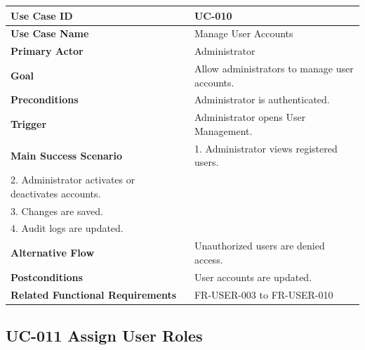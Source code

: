 \begin{longtable}{|p{4cm}|p{10cm}|}

\hline
\textbf{Use Case ID} &
UC-010 \\
\hline

\textbf{Use Case Name} &
Manage User Accounts \\
\hline

\textbf{Primary Actor} &
Administrator \\
\hline

\textbf{Goal} &
Allow administrators to manage user accounts. \\
\hline

\textbf{Preconditions} &
Administrator is authenticated. \\
\hline

\textbf{Trigger} &
Administrator opens User Management. \\
\hline

\textbf{Main Success Scenario} &
1. Administrator views registered users.\\
2. Administrator activates or deactivates accounts.\\
3. Changes are saved.\\
4. Audit logs are updated.\\
\hline

\textbf{Alternative Flow} &
Unauthorized users are denied access.\\
\hline

\textbf{Postconditions} &
User accounts are updated.\\
\hline

\textbf{Related Functional Requirements} &
FR-USER-003 to FR-USER-010 \\
\hline

\end{longtable}

\subsection{UC-011 Assign User Roles}

